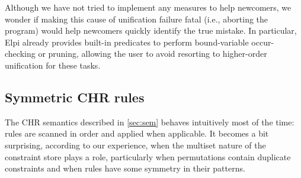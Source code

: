 \documentclass[a4paper, 11pt]{book}
\begin{document}
Although we have not tried to implement any measures to help newcomers, we
wonder if making this cause of unification failure fatal (i.e., aborting the
program) would help newcomers quickly identify the true mistake. In
particular, Elpi already provides built-in predicates to perform
bound-variable occur-checking or pruning, allowing the user to avoid resorting
to higher-order unification for these tasks.

\subsection{Symmetric CHR rules}

The CHR semantics described in \cref{sec:sem} behaves intuitively most of the
time: rules are scanned in order and applied when applicable. It becomes a bit
surprising, according to our experience, when the multiset nature of the
constraint store plays a role, particularly when permutations contain
duplicate constraints and when rules have some symmetry in their patterns.
\end{document}

